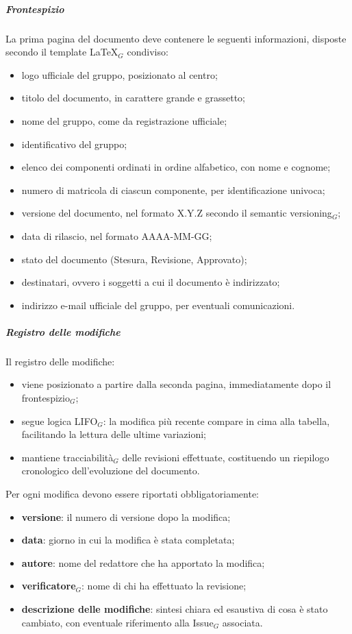 \documentclass[a4paper, 10pt]{article}
\begin{document}
\subparagraph{Frontespizio} 

La prima pagina del documento deve contenere le seguenti informazioni, disposte secondo il template \LaTeX$_G$ condiviso:
\begin{itemize}
    \item logo ufficiale del gruppo, posizionato al centro;
    \item titolo del documento, in carattere grande e grassetto;
    \item nome del gruppo, come da registrazione ufficiale;
    \item identificativo del gruppo;
    \item elenco dei componenti ordinati in ordine alfabetico, con nome e cognome;
    \item numero di matricola di ciascun componente, per identificazione univoca;
    \item versione del documento, nel formato X.Y.Z secondo il semantic versioning$_G$;
    \item data di rilascio, nel formato AAAA-MM-GG;
    \item stato del documento (Stesura, Revisione, Approvato);
    \item destinatari, ovvero i soggetti a cui il documento è indirizzato;
    \item indirizzo e-mail ufficiale del gruppo, per eventuali comunicazioni.
\end{itemize}

\subparagraph{Registro delle modifiche}

Il registro delle modifiche:
\begin{itemize}
    \item viene posizionato a partire dalla seconda pagina, immediatamente dopo il frontespizio$_G$;
    \item segue logica LIFO$_G$: la modifica più recente compare in cima alla tabella, facilitando la lettura delle ultime variazioni;
    \item mantiene tracciabilità$_G$ delle revisioni effettuate, costituendo un riepilogo cronologico dell'evoluzione del documento.
\end{itemize}

Per ogni modifica devono essere riportati obbligatoriamente:
\begin{itemize}
    \item \textbf{versione}: il numero di versione dopo la modifica;
    \item \textbf{data}: giorno in cui la modifica è stata completata;
    \item \textbf{autore}: nome del redattore che ha apportato la modifica;
    \item \textbf{verificatore$_G$}: nome di chi ha effettuato la revisione;
    \item \textbf{descrizione delle modifiche}: sintesi chiara ed esaustiva di cosa è stato cambiato, con eventuale riferimento alla Issue$_G$ associata.
\end{itemize}
\end{document}
